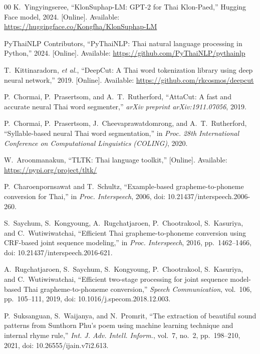 \documentclass[conference]{IEEEtran}
\begin{document}
\begin{thebibliography}{00}
\setlength{\itemsep}{0pt}
\setlength{\parsep}{0pt}
K.~Yingyingseree, ``KlonSuphap-LM: GPT-2 for Thai Klon-Paed,'' Hugging
Face model, 2024. [Online]. Available:
\url{https://huggingface.co/Kongfha/KlonSuphap-LM}

PyThaiNLP Contributors, ``PyThaiNLP: Thai natural language processing in
Python,'' 2024. [Online]. Available: \url{https://github.com/PyThaiNLP/pythainlp}

T.~Kittinaradorn, \emph{et al.}, ``DeepCut: A Thai word tokenization
library using deep neural network,'' 2019. [Online]. Available:
\url{https://github.com/rkcosmos/deepcut}

P.~Chormai, P.~Prasertsom, and A.~T.~Rutherford, ``AttaCut: A fast and
accurate neural Thai word segmenter,'' \emph{arXiv preprint
arXiv:1911.07056}, 2019.

P.~Chormai, P.~Prasertsom, J.~Cheevaprawatdomrong, and A.~T.~Rutherford,
``Syllable-based neural Thai word segmentation,'' in \emph{Proc. 28th
International Conference on Computational Linguistics (COLING)}, 2020.

W.~Aroonmanakun, ``TLTK: Thai language toolkit,'' [Online]. Available:
\url{https://pypi.org/project/tltk/}

P.~Charoenpornsawat and T.~Schultz, ``Example-based grapheme-to-phoneme
conversion for Thai,'' in \emph{Proc. Interspeech}, 2006,
doi: 10.21437/interspeech.2006-260.

S.~Saychum, S.~Kongyoung, A.~Rugchatjaroen, P.~Chootrakool, S.~Kasuriya,
and C.~Wutiwiwatchai, ``Efficient Thai grapheme-to-phoneme conversion using
CRF-based joint sequence modeling,'' in \emph{Proc. Interspeech}, 2016,
pp.~1462--1466, doi: 10.21437/interspeech.2016-621.

A.~Rugchatjaroen, S.~Saychum, S.~Kongyoung, P.~Chootrakool, S.~Kasuriya,
and C.~Wutiwiwatchai, ``Efficient two-stage processing for joint sequence
model-based Thai grapheme-to-phoneme conversion,'' \emph{Speech
Communication}, vol.~106, pp.~105--111, 2019,
doi: 10.1016/j.specom.2018.12.003.

P.~Suksanguan, S.~Waijanya, and N.~Promrit, ``The extraction of beautiful
sound patterns from Sunthorn Phu's poem using machine learning technique
and internal rhyme rule,'' \emph{Int. J. Adv. Intell. Inform.}, vol.~7,
no.~2, pp.~198--210, 2021, doi: 10.26555/ijain.v7i2.613.


\end{thebibliography}
\end{document}
